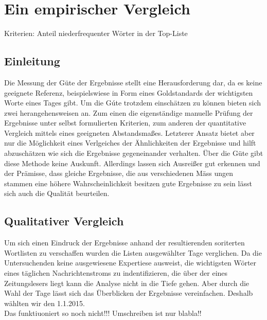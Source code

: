  








\chapter{Ein empirischer Vergleich}
 
Kriterien: Anteil niederfrequenter Wörter in der Top-Liste\\
\section{Einleitung}
Die Messung der G\"ute der Ergebnisse stellt eine Herausforderung dar, da es keine geeignete Referenz, beispielswiese in Form eines Goldstandards der wichtigsten Worte eines Tages gibt. Um die G\'ute trotzdem einsch\"atzen zu k\"onnen bieten sich zwei herangehensweisen an. Zum einen die eigenst\"andige manuelle Pr\"ufung der Ergebnisse unter selbst formulierten Kriterien, zum anderen der quantitative Vergleich mittels eines geeigneten Abstandsma\ss es. Letzterer Ansatz bietet aber nur die M\"oglichkeit eines Verlgeiches der \"Ahnlichkeiten der Ergebnisse und hilft abzusch\"atzen wie sich die Ergebnisse gegeneinander verhalten. \"Uber die G\"ute gibt diese Methode keine Auskunft. Allerdings lassen sich Ausrei\ss er gut erkennen und der Pr\"amisse, dass gleiche Ergebnisse, die aus verschiedenen M\"ass ungen stammen eine h\"ohere Wahrscheinlichkeit besitzen gute Ergebnisse zu sein l\"asst sich auch die Qualit\"at beurteilen.
\section{Qualitativer Vergleich}
Um sich einen Eindruck der Ergebnisse anhand der resultierenden soriterten Wortlisten zu verschaffen wurden die Listen ausgew\"ahlter Tage verglichen. Da die Untersuchenden keine ausgewiesene Expertiese ausweist, die wichtigsten W\"orter eines t\"aglichen Nachrichtenstroms zu indentifizieren, die \"uber der eines Zeitungslesers liegt kann die Analyse nicht in die Tiefe gehen. Aber durch die Wahl der Tage l\"asst sich das \"Uberblicken der Ergebnisse vereinfachen. Deshalb w\"ahlten wir den 1.1.2015. \\
 Das funktiuoniert so noch nicht!!! Umschreiben ist nur blabla!!
